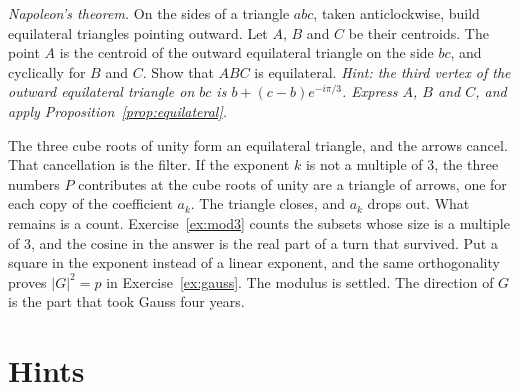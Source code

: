\begin{exercise}[$\star\star\star$]\label{ex:napoleon}
\emph{Napoleon's theorem.} On the sides of a triangle $abc$, taken anticlockwise, build equilateral triangles pointing outward. Let $A$, $B$ and $C$ be their centroids. The point $A$ is the centroid of the outward equilateral triangle on the side $bc$, and cyclically for $B$ and $C$. Show that $ABC$ is equilateral.
\emph{Hint: the third vertex of the outward equilateral triangle on $bc$ is $b+(c-b)e^{-i\pi/3}$. Express $A$, $B$ and $C$, and apply Proposition~\ref{prop:equilateral}.}
\end{exercise}

\begin{beauty}
The three cube roots of unity form an equilateral triangle, and the arrows cancel. That cancellation is the filter. If the exponent $k$ is not a multiple of $3$, the three numbers $P$ contributes at the cube roots of unity are a triangle of arrows, one for each copy of the coefficient $a_k$. The triangle closes, and $a_k$ drops out. What remains is a count. Exercise~\ref{ex:mod3} counts the subsets whose size is a multiple of $3$, and the cosine in the answer is the real part of a turn that survived. Put a square in the exponent instead of a linear exponent, and the same orthogonality proves $|G|^2=p$ in Exercise~\ref{ex:gauss}. The modulus is settled. The direction of $G$ is the part that took Gauss four years.
\end{beauty}

\section{Hints}

